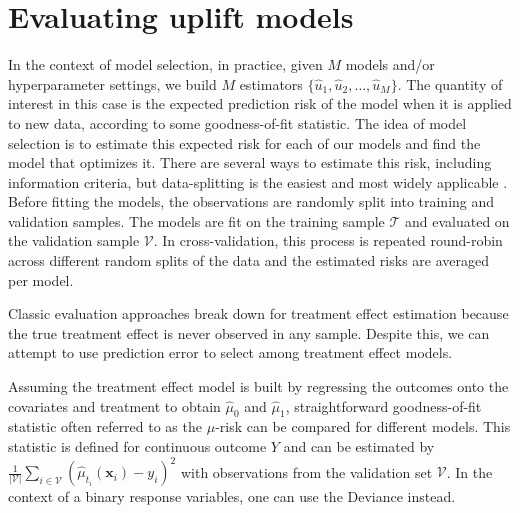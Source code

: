 \documentclass{article}
\def\x{\mathbf x}
\begin{document}



\section{Evaluating uplift models}\label{sec:qini}

In the context of model selection, in practice, given $M$ models and/or hyperparameter settings, we build $M$ estimators $\{ \hat{u}_1, \hat{u}_2, \ldots, \hat{u}_M \}$. The quantity of interest in this case is the expected prediction risk of the model when it is applied to new data, according to some goodness-of-fit statistic. The idea of model selection is to estimate this expected risk for each of our models and find the model that optimizes it. There are several ways to estimate this risk, including information criteria, but data-splitting is the easiest and most widely applicable \citep{arlot2010survey}. Before fitting the models, the observations are randomly split into training and validation samples. The models are fit on the training sample $\mathcal{T}$ and evaluated on the validation sample $\mathcal{V}$. In cross-validation, this process is repeated round-robin across different random splits of the data and the estimated risks are averaged per model.

Classic evaluation approaches break down for treatment effect estimation because the true treatment effect is never observed in any sample. Despite this, we can attempt to use prediction error to select among treatment effect models.

Assuming the treatment effect model is built by regressing the outcomes onto the covariates and treatment to obtain $\hat\mu_0$ and $\hat\mu_1$, straightforward goodness-of-fit statistic often referred to as the $\mu$-risk can be compared for different models. This statistic is defined for continuous outcome $Y$ and can be estimated by $\frac{1}{|\mathcal{V}|}\sum_{i \in \mathcal{V}}( \hat{\mu}_{t_i}(\x_i) - y_i )^2$ with observations from the validation set $\mathcal{V}$. In the context of a binary response variables, one can use the Deviance instead.
\end{document}

